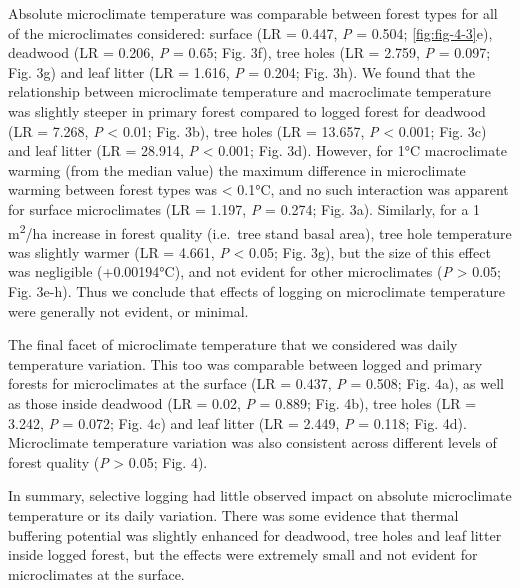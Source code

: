 \documentclass[12pt,a4paper,]{report}
\theoremstyle{definition}
\theoremstyle{definition}
\theoremstyle{definition}
\theoremstyle{remark}
\begin{document}
Absolute microclimate temperature was comparable between forest types
for all of the microclimates considered: surface (LR = 0.447, \emph{P} =
0.504; \autoref{fig:fig-4-3}e), deadwood (LR = 0.206, \emph{P} = 0.65;
Fig. 3f), tree holes (LR = 2.759, \emph{P} = 0.097; Fig. 3g) and leaf
litter (LR = 1.616, \emph{P} = 0.204; Fig. 3h). We found that the
relationship between microclimate temperature and macroclimate
temperature was slightly steeper in primary forest compared to logged
forest for deadwood (LR = 7.268, \emph{P} \textless{} 0.01; Fig. 3b),
tree holes (LR = 13.657, \emph{P} \textless{} 0.001; Fig. 3c) and leaf
litter (LR = 28.914, \emph{P} \textless{} 0.001; Fig. 3d). However, for
1°C macroclimate warming (from the median value) the maximum difference
in microclimate warming between forest types was \textless{} 0.1°C, and
no such interaction was apparent for surface microclimates (LR = 1.197,
\emph{P} = 0.274; Fig. 3a). Similarly, for a 1 m\textsuperscript{2}/ha
increase in forest quality (i.e.~tree stand basal area), tree hole
temperature was slightly warmer (LR = 4.661, \emph{P} \textless{} 0.05;
Fig. 3g), but the size of this effect was negligible (+0.00194°C), and
not evident for other microclimates (\emph{P} \textgreater{} 0.05; Fig.
3e-h). Thus we conclude that effects of logging on microclimate
temperature were generally not evident, or minimal.

The final facet of microclimate temperature that we considered was daily
temperature variation. This too was comparable between logged and
primary forests for microclimates at the surface (LR = 0.437, \emph{P} =
0.508; Fig. 4a), as well as those inside deadwood (LR = 0.02, \emph{P} =
0.889; Fig. 4b), tree holes (LR = 3.242, \emph{P} = 0.072; Fig. 4c) and
leaf litter (LR = 2.449, \emph{P} = 0.118; Fig. 4d). Microclimate
temperature variation was also consistent across different levels of
forest quality (\emph{P} \textgreater{} 0.05; Fig. 4).

In summary, selective logging had little observed impact on absolute
microclimate temperature or its daily variation. There was some evidence
that thermal buffering potential was slightly enhanced for deadwood,
tree holes and leaf litter inside logged forest, but the effects were
extremely small and not evident for microclimates at the surface.
\end{document}
